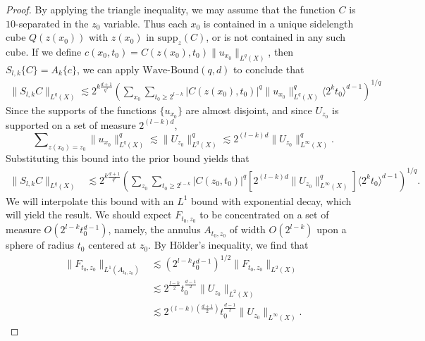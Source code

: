 \begin{proof}
    By applying the triangle inequality, we may assume that the function $C$ is $10$-separated in the $z_0$ variable. Thus each $x_0$ is contained in a unique sidelength cube $Q(z(x_0))$ with $z(x_0)$ in $\text{supp}_z(C)$, or is not contained in any such cube. If we define $c(x_0,t_0) = C(z(x_0),t_0) \| u_{x_0} \|_{L^q(X)}$, then $S_{l,k} \{ C \} = A_k \{ c \}$, we can apply $\text{Wave-Bound}(q,d)$ to conclude that
    \begin{align*}
      \| S_{l,k} C \|_{L^q(X)} \lesssim 2^{k \frac{d+1}{q^*}} \left( \sum\nolimits_{x_0} \sum\nolimits_{t_0 \geq 2^{l-k}} |C(z(x_0),t_0)|^q \| u_{x_0} \|_{L^q(X)}^q \langle 2^k t_0 \rangle^{d-1} \right)^{1/q}
    \end{align*}
    Since the supports of the functions $\{ u_{x_0} \}$ are almost disjoint, and since $U_{z_0}$ is supported on a set of measure $2^{(l-k)d}$,
    \[ \sum\nolimits_{z(x_0) = z_0} \| u_{x_0} \|_{L^q(X)}^q \lesssim \| U_{z_0} \|_{L^q(X)}^q \lesssim 2^{(l-k)d} \| U_{z_0} \|_{L^\infty(X)}^q. \]
    Substituting this bound into the prior bound yields that
    \begin{align*}
        \| S_{l,k} C \|_{L^q(X)} &\lesssim 2^{k \frac{d+1}{q'}} \left( \sum\nolimits_{z_0} \sum\nolimits_{t_0 \geq 2^{l-k}} |C(z_0,t_0)|^q \left[ 2^{(l-k)d} \| U_{z_0} \|_{L^\infty(X)}^q \right] \langle 2^k t_0 \rangle^{d-1} \right)^{1/q}.
    \end{align*}
    We will interpolate this bound with an $L^1$ bound with exponential decay, which will yield the result. We should expect $F_{t_0,z_0}$ to be concentrated on a set of measure $O( 2^{l-k} t_0^{d-1} )$, namely, the annulus $A_{t_0,z_0}$ of width $O(2^{l-k})$ upon a sphere of radius $t_0$ centered at $z_0$. By H\"{o}lder's inequality, we find that
    \begin{align*}
        \| F_{t_0,z_0} \|_{L^1(A_{t_0,z_0})} &\lesssim \left( 2^{l-k} t_0^{d-1} \right)^{1/2} \| F_{t_0,z_0} \|_{L^2(X)}\\
        &\lesssim 2^{\frac{l-k}{2}} t_0^{\frac{d-1}{2}} \| U_{z_0} \|_{L^2(X)}\\
        &\lesssim 2^{(l-k) \left( \frac{d+1}{2}\right)} t_0^{\frac{d-1}{2}} \| U_{z_0} \|_{L^\infty(X)}.

\end{align*}
\end{proof}
